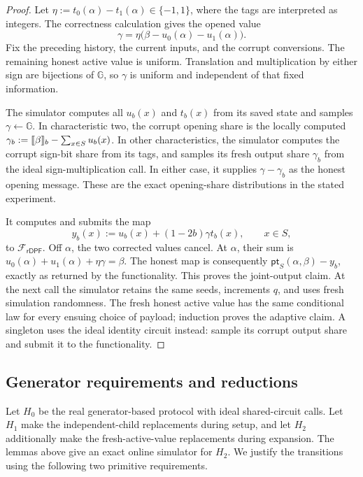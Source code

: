 \begin{proof}
Let $\eta:=t_0(\alpha)-t_1(\alpha)\in\{-1,1\}$, where the tags are
interpreted as integers. The correctness calculation gives the opened value
\[
 \gamma=\eta\bigl(\beta-u_0(\alpha)-u_1(\alpha)\bigr).
\]
Fix the preceding history, the current inputs, and the corrupt conversions.
The remaining honest active value is uniform. Translation and multiplication
by either sign are bijections of $\mathbb G$, so $\gamma$ is uniform and
independent of that fixed information.

The simulator computes all $u_b(x)$ and $t_b(x)$ from its saved state and
samples $\gamma\gets\mathbb G$. In characteristic two, the corrupt opening
share is the locally computed
$\gamma_b:=\share\beta_b-\sum_{x\in S}u_b(x)$.
In other characteristics, the simulator computes the corrupt sign-bit share
from its tags, and samples its fresh output share $\gamma_b$ from the ideal
sign-multiplication call. In either case, it supplies
$\gamma-\gamma_b$ as the honest opening message. These are the exact
opening-share distributions in the stated experiment.

It computes and submits the map
\[
 y_b(x):=u_b(x)+(1-2b)\gamma t_b(x),\qquad x\in S,
\]
to $\mathcal F_{\mathsf{rDPF}}$. Off $\alpha$, the two corrected values
cancel. At $\alpha$, their sum is
$u_0(\alpha)+u_1(\alpha)+\eta\gamma=\beta$.
The honest map is consequently $\mathsf{pt}_S(\alpha,\beta)-y_b$,
exactly as returned by the functionality. This proves the joint-output
claim. At the next call the simulator retains the same seeds, increments
$q$, and uses fresh simulation randomness. The fresh honest active value
has the same conditional law for every ensuing choice of payload; induction
proves the adaptive claim. A singleton uses the ideal identity circuit
instead: sample its corrupt output share and submit it to the functionality.
\end{proof}

\subsection{Generator requirements and reductions}

Let $H_0$ be the real generator-based protocol with ideal shared-circuit
calls. Let $H_1$ make the independent-child replacements during setup,
and let $H_2$ additionally make the fresh-active-value replacements during
expansion. The lemmas above give an exact online simulator for $H_2$.
We justify the transitions using the following two primitive requirements.

